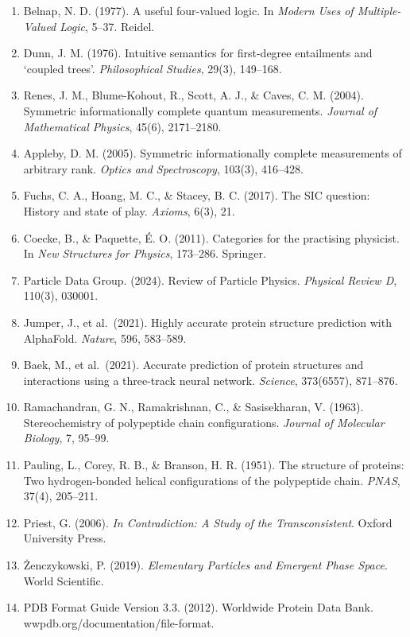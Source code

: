 \documentclass[12pt,a4paper]{article}
\begin{document}
\begin{enumerate}
\def\labelenumi{\arabic{enumi}.}
\item
  Belnap, N. D. (1977). A useful four-valued logic. In \emph{Modern Uses
  of Multiple-Valued Logic}, 5--37. Reidel.
\item
  Dunn, J. M. (1976). Intuitive semantics for first-degree entailments
  and `coupled trees'. \emph{Philosophical Studies}, 29(3), 149--168.
\item
  Renes, J. M., Blume-Kohout, R., Scott, A. J., \& Caves, C. M. (2004).
  Symmetric informationally complete quantum measurements. \emph{Journal
  of Mathematical Physics}, 45(6), 2171--2180.
\item
  Appleby, D. M. (2005). Symmetric informationally complete measurements
  of arbitrary rank. \emph{Optics and Spectroscopy}, 103(3), 416--428.
\item
  Fuchs, C. A., Hoang, M. C., \& Stacey, B. C. (2017). The SIC question:
  History and state of play. \emph{Axioms}, 6(3), 21.
\item
  Coecke, B., \& Paquette, É. O. (2011). Categories for the practising
  physicist. In \emph{New Structures for Physics}, 173--286. Springer.
\item
  Particle Data Group. (2024). Review of Particle Physics.
  \emph{Physical Review D}, 110(3), 030001.
\item
  Jumper, J., et al.~(2021). Highly accurate protein structure
  prediction with AlphaFold. \emph{Nature}, 596, 583--589.
\item
  Baek, M., et al.~(2021). Accurate prediction of protein structures and
  interactions using a three-track neural network. \emph{Science},
  373(6557), 871--876.
\item
  Ramachandran, G. N., Ramakrishnan, C., \& Sasisekharan, V. (1963).
  Stereochemistry of polypeptide chain configurations. \emph{Journal of
  Molecular Biology}, 7, 95--99.
\item
  Pauling, L., Corey, R. B., \& Branson, H. R. (1951). The structure of
  proteins: Two hydrogen-bonded helical configurations of the
  polypeptide chain. \emph{PNAS}, 37(4), 205--211.
\item
  Priest, G. (2006). \emph{In Contradiction: A Study of the
  Transconsistent}. Oxford University Press.
\item
  Żenczykowski, P. (2019). \emph{Elementary Particles and Emergent Phase
  Space}. World Scientific.
\item
  PDB Format Guide Version 3.3. (2012). Worldwide Protein Data Bank.
  wwpdb.org/documentation/file-format.
\end{enumerate}
\end{document}
